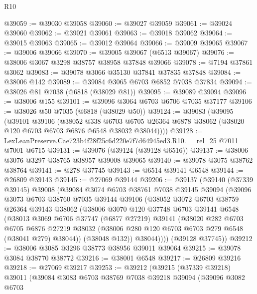 \begin{lexlean}{R10}
\begin{coremodule}
@39059 := @39030 @39058
@39060 := @39027 @39059
@39061 := @39024 @39060
@39062 := @39021 @39061
@39063 := @39018 @39062
@39064 := @39015 @39063
@39065 := @39012 @39064
@39066 := @39009 @39065
@39067 := @39006 @39066
@39070 := @39005 @39067 (@6513 @39067)
@39076 := @38006 @3067 @3298 @38757 @38958 @37848 @39066
@39078 := @7194 @37861 @3062
@39083 := @39078 @3066 @35130 @37841 @37835 @37848
@39084 := @38006 @142
@39089 := @39084 @3065 @6703 @6852 @7038 @37834
@39094 := @38026 @81 @7038 (@6818 (@38029 @81))
@39095 := @39089 @39094
@39096 := @38006 @155
@39101 := @39096 @3064 @6703 @6706 @7035 @37177
@39106 := @38026 @50 @7035 (@6818 (@38029 @50))
@39124 := @39083
    (@39095
      (@39101
        @39106
        (@38052
          @338
          @6703
          @6705
          @26364
          @6878
          @38062
          (@38020 @120 @6703 @6703 @6876 @6548 @38032 @38044))))
@39128 := LexLeanPreserve.Cae723b4f28f25c6d220e7f7d64945ed3.R10.__rel_25 @7011 @7001 @6715
@39131 := @39076 (@39124 (@39128 @6516))
@39137 := @38006 @3076 @3297 @38765 @38957 @39008 @39065
@39140 := @39078 @3075 @38762 @38764
@39141 := @278 @37745
@39143 := @6514 @39141 @6548
@39144 := @26809 @39143
@39145 := @27069 @39144
@39206 := @39137
    (@39140
      (@37339 @39145)
      @39008
      (@39084
        @3074
        @6703
        @38761
        @7038
        @39145
        @39094
        (@39096
          @3073
          @6703
          @38760
          @7035
          @39144
          @39106
          (@38052
            @3072
            @6703
            @38759
            @26364
            @39143
            @38062
            (@38006
              @3070
              @120
              @37748
              @6703
              @39141
              @6548
              (@38013
                @3069
                @6706
                @37747
                (@6877 @27219)
                @39141
                (@38020
                  @282
                  @6703
                  @6705
                  @6876
                  @27219
                  @38032
                  (@38006 @280 @120 @6703 @6703 @279 @6548 (@38041 @279) @38044))
                (@38048 @132))
              @38044))))
      (@39128 @37745))
@39212 := @38006 @3085 @3296 @38773 @38956 @39011 @39064
@39215 := @39078 @3084 @38770 @38772
@39216 := @38001 @6548
@39217 := @26809 @39216
@39218 := @27069 @39217
@39253 := @39212
    (@39215
      (@37339 @39218)
      @39011
      (@39084
        @3083
        @6703
        @38769
        @7038
        @39218
        @39094
        (@39096
          @3082
          @6703

\end{coremodule}
\end{lexlean}
